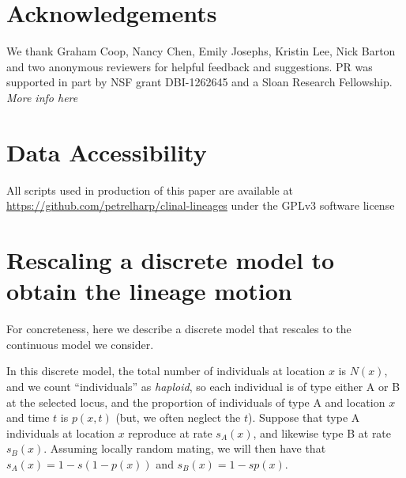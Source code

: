 \documentclass[11pt,letterpaper]{article}
\newcommand{\alisa}[1]{{\em \color{red} #1}}
\begin{document}

\section*{Acknowledgements}
We thank Graham Coop, Nancy Chen, Emily Josephs, Kristin Lee, Nick Barton and two anonymous reviewers for helpful feedback and suggestions.
PR was supported in part by NSF grant DBI-1262645 and a Sloan Research Fellowship.
\alisa{More info here}




\section*{Data Accessibility}

All scripts used in production of this paper are available at 
\url{https://github.com/petrelharp/clinal-lineages}
under the GPLv3 software license

\appendix
\setcounter{table}{0}
\renewcommand{\thetable}{S\arabic{table}}
\setcounter{figure}{0}
\renewcommand{\thefigure}{S\arabic{figure}}


\section{Rescaling a discrete model to obtain the lineage motion}
\label{apx:lineage_derivation}

For concreteness, here we describe a discrete model that rescales to the continuous model we consider.

In this discrete model, the total number of individuals at location $x$ is $N(x)$,
and we count ``individuals'' as \emph{haploid},
so each individual is of type either A or B at the selected locus,
and the proportion of individuals of type A and location $x$ and time $t$ is $p(x,t)$
(but, we often neglect the $t$).
Suppose that type A individuals at location $x$ reproduce at rate $s_A(x)$, 
and likewise type B at rate $s_B(x)$.
Assuming locally random mating, we will then have that
$s_A(x) = 1 - s (1-p(x))$ and $s_B(x) = 1 - s p(x)$.
\end{document}
